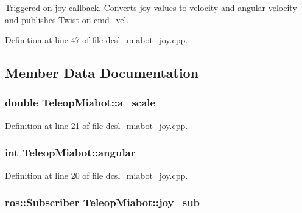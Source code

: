 \-Triggered on joy callback. \-Converts joy values to velocity and angular velocity and publishes \-Twist on cmd\-\_\-vel. 



\-Definition at line 47 of file dcsl\-\_\-miabot\-\_\-joy.\-cpp.



\subsection{\-Member \-Data \-Documentation}
\subsubsection[{a\-\_\-scale\-\_\-}]{\setlength{\rightskip}{0pt plus 5cm}double {\bf \-Teleop\-Miabot\-::a\-\_\-scale\-\_\-}\hspace{0.3cm}{\ttfamily  [private]}}\label{classTeleopMiabot_a1fb244f8b0194a89c95410472c3cfcd8}


\-Definition at line 21 of file dcsl\-\_\-miabot\-\_\-joy.\-cpp.

\subsubsection[{angular\-\_\-}]{\setlength{\rightskip}{0pt plus 5cm}int {\bf \-Teleop\-Miabot\-::angular\-\_\-}\hspace{0.3cm}{\ttfamily  [private]}}\label{classTeleopMiabot_a91ecc1e3007d3675b1ff7a5047b1a53d}


\-Definition at line 20 of file dcsl\-\_\-miabot\-\_\-joy.\-cpp.

\subsubsection[{joy\-\_\-sub\-\_\-}]{\setlength{\rightskip}{0pt plus 5cm}ros\-::\-Subscriber {\bf \-Teleop\-Miabot\-::joy\-\_\-sub\-\_\-}\hspace{0.3cm}{\ttfamily  [private]}}\label{classTeleopMiabot_ab94f106a0adc2381ebfdebb428682457}


